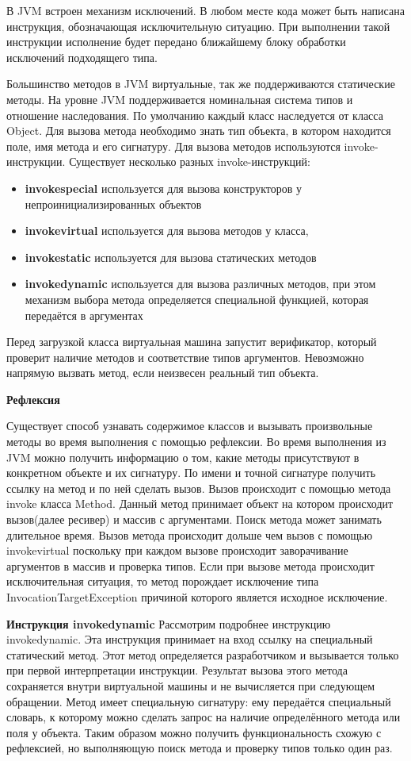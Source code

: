 В JVM встроен механизм исключений. В любом месте кода может быть написана инструкция, обозначающая исключительную ситуацию. При выполнении такой инструкции исполнение будет передано ближайшему блоку обработки исключений подходящего типа.

Большинство методов в JVM виртуальные, так же поддерживаются статические методы.
На уровне JVM поддерживается номинальная система типов и отношение наследования. По умолчанию каждый класс наследуется от класса Object. Для вызова метода необходимо знать тип объекта, в котором находится поле, имя метода и его сигнатуру. Для вызова методов используются invoke-инструкции. Существует несколько разных invoke-инструкций:
\begin{itemize}
    \item \textbf{invokespecial} используется для вызова конструкторов у непроинициализированных объектов
    \item \textbf{invokevirtual} используется для вызова методов у класса,
    \item \textbf{invokestatic} используется для вызова статических методов
    \item \textbf{invokedynamic} используется для вызова различных методов, при этом механизм выбора метода определяется специальной функцией, которая передаётся в аргументах
\end{itemize}
Перед загрузкой класса виртуальная машина запустит верификатор, который проверит наличие методов и соответствие типов аргументов. Невозможно напрямую вызвать метод, если неизвесен реальный тип объекта.

\textbf{Рефлексия}

Существует способ узнавать содержимое классов и вызывать произвольные методы во время выполнения с помощью рефлексии. Во время выполнения из JVM можно получить информацию о том, какие методы присутствуют в конкретном объекте и их сигнатуру. По имени и точной сигнатуре получить ссылку на метод и по ней сделать вызов. Вызов происходит с помощью метода invoke класса Method. Данный метод принимает объект на котором происходит вызов(далее ресивер) и массив с аргументами. Поиск метода может занимать длительное время. Вызов метода происходит дольше чем вызов с помощью invokevirtual поскольку при каждом вызове происходит заворачивание аргументов в массив и проверка типов. Если при вызове метода происходит исключительная ситуация, то метод порождает исключение типа InvocationTargetException причиной которого является исходное исключение.

\textbf{Инструкция invokedynamic}
Рассмотрим подробнее инструкцию invokedynamic. Эта инструкция принимает на вход ссылку на специальный статический метод. Этот метод определяется разработчиком и вызывается только при первой интерпретации инструкции. Результат вызова этого метода сохраняется внутри виртуальной машины и не вычисляется при следующем обращении. Метод имеет специальную сигнатуру: ему передаётся специальный словарь, к которому можно сделать запрос на наличие определённого метода или поля у объекта. Таким образом можно получить функциональность схожую с рефлексией, но выполняющую поиск метода и проверку типов только один раз.

